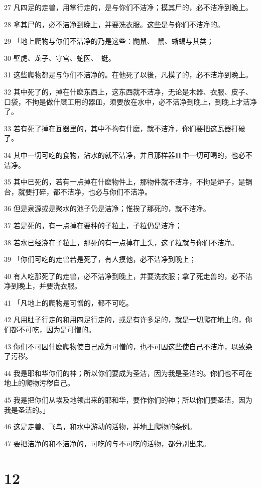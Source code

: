 \par 27 凡四足的走兽，用掌行走的，是与你们不洁净；摸其尸的，必不洁净到晚上。
\par 28 拿其尸的，必不洁净到晚上，并要洗衣服。这些是与你们不洁净的。
\par 29 「地上爬物与你们不洁净的乃是这些：鼬鼠、　鼠、蜥蜴与其类；
\par 30 壁虎、龙子、守宫、蛇医、　蜓。
\par 31 这些爬物都是与你们不洁净的。在他死了以後，凡摸了的，必不洁净到晚上。
\par 32 其中死了的，掉在什麽东西上，这东西就不洁净，无论是木器、衣服、皮子、口袋，不拘是做什麽工用的器皿，须要放在水中，必不洁净到晚上，到晚上才洁净了。
\par 33 若有死了掉在瓦器里的，其中不拘有什麽，就不洁净，你们要把这瓦器打破了。
\par 34 其中一切可吃的食物，沾水的就不洁净，并且那样器皿中一切可喝的，也必不洁净。
\par 35 其中已死的，若有一点掉在什麽物件上，那物件就不洁净，不拘是炉子，是锅台，就要打碎，都不洁净，也必与你们不洁净。
\par 36 但是泉源或是聚水的池子仍是洁净；惟挨了那死的，就不洁净。
\par 37 若是死的，有一点掉在要种的子粒上，子粒仍是洁净；
\par 38 若水已经浇在子粒上，那死的有一点掉在上头，这子粒就与你们不洁净。
\par 39 「你们可吃的走兽若是死了，有人摸他，必不洁净到晚上；
\par 40 有人吃那死了的走兽，必不洁净到晚上，并要洗衣服；拿了死走兽的，必不洁净到晚上，并要洗衣服。
\par 41 「凡地上的爬物是可憎的，都不可吃。
\par 42 凡用肚子行走的和用四足行走的，或是有许多足的，就是一切爬在地上的，你们都不可吃，因为是可憎的。
\par 43 你们不可因什麽爬物使自己成为可憎的，也不可因这些使自己不洁净，以致染了污秽。
\par 44 我是耶和华你们的神；所以你们要成为圣洁，因为我是圣洁的。你们也不可在地上的爬物污秽自己。
\par 45 我是把你们从埃及地领出来的耶和华，要作你们的神；所以你们要圣洁，因为我是圣洁的。」
\par 46 这是走兽、飞鸟，和水中游动的活物，并地上爬物的条例。
\par 47 要把洁净的和不洁净的，可吃的与不可吃的活物，都分别出来。

\chapter{12}

